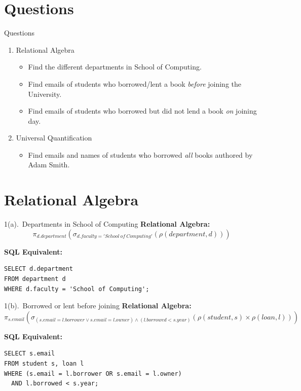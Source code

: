 \documentclass{beamer}
\begin{document}
\section{Questions}
\begin{frame}{Questions}
\footnotesize
\begin{enumerate}
  \item Relational Algebra
  \begin{itemize}
    \item[(a)] Find the different departments in School of Computing.
    \item[(b)] Find emails of students who borrowed/lent a book \emph{before} joining the University.
    \item[(c)] Find emails of students who borrowed but did not lend a book \emph{on} joining day.
  \end{itemize}
  \item Universal Quantification
  \begin{itemize}
    \item[(a)] Find emails and names of students who borrowed \emph{all} books authored by Adam Smith.
  \end{itemize}
\end{enumerate}
\end{frame}

\section{Relational Algebra}
\begin{frame}[fragile]{1(a).\ Departments in School of Computing}
\textbf{Relational Algebra:}\\
\[
\pi_{d.department}(\sigma_{d.faculty='School\ of\ Computing'}(\rho(department, d)))
\]

\textbf{SQL Equivalent:}
\begin{lstlisting}
SELECT d.department
FROM department d
WHERE d.faculty = 'School of Computing';
\end{lstlisting}
\end{frame}

\begin{frame}[fragile]{1(b).\ Borrowed or lent before joining}
\textbf{Relational Algebra:}\\
$
\pi_{s.email}(
\sigma_{(s.email=l.borrower \lor s.email=l.owner)\wedge(l.borrowed<s.year)}
(\rho(student,s)\times\rho(loan,l)))
$

\textbf{SQL Equivalent:}
\begin{lstlisting}
SELECT s.email
FROM student s, loan l
WHERE (s.email = l.borrower OR s.email = l.owner)
  AND l.borrowed < s.year;
\end{lstlisting}
\end{frame}
\end{document}
